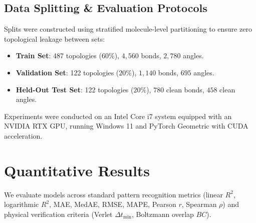 \documentclass[10pt,journal,compsoc]{IEEEtran}
\begin{document}
\subsection{Data Splitting \& Evaluation Protocols}
Splits were constructed using stratified molecule-level partitioning to ensure zero topological leakage between sets:
\begin{itemize}
    \item \textbf{Train Set}: 487 topologies ($60\%$), $4{,}560$ bonds, $2{,}780$ angles.
    \item \textbf{Validation Set}: 122 topologies ($20\%$), $1{,}140$ bonds, $695$ angles.
    \item \textbf{Held-Out Test Set}: 122 topologies ($20\%$), $780$ clean bonds, $458$ clean angles.
\end{itemize}

Experiments were conducted on an Intel Core i7 system equipped with an NVIDIA RTX GPU, running Windows 11 and PyTorch Geometric with CUDA acceleration.

\section{Quantitative Results}
\label{sec:results}

We evaluate models across standard pattern recognition metrics (linear $R^2$, logarithmic $R^2$, MAE, MedAE, RMSE, MAPE, Pearson $r$, Spearman $\rho$) and physical verification criteria (Verlet $\Delta t_{\min}$, Boltzmann overlap $BC$).
\end{document}
